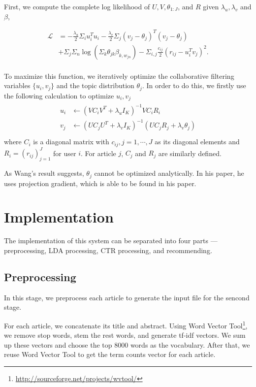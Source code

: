 \documentclass{acm_proc_article-sp}
\begin{document}
First, we compute the complete log likelihood of $U, V, \theta_{1:J}$, and $R$ given $\lambda_u, \lambda_v$ and $\beta$,

\begin{equation}
\begin{aligned}
\mathcal{L}&=-\frac{\lambda_u}{2}\Sigma_iu_i^Tu_i-\frac{\lambda_v}{2}\Sigma_j(v_j-\theta_j)^T(v_j-\theta_j)\\
&+\Sigma_j\Sigma_n\log(\Sigma_k\theta_{jk}\beta_{k,w_{jn}})-\Sigma_{i,j}\frac{c_{ij}}{2}(r_{ij}-u_i^Tv_j)^2.\\
\end{aligned}
\end{equation}

To maximize this function, we iteratively optimize the collaborative filtering variables $\{u_i,v_j\}$ and the topic distribution $\theta_j$. In order to do this, we firstly use the following calculation to optimize $u_i, v_j$
\begin{eqnarray}
\begin{aligned}
u_i &\leftarrow (VC_iV^T+\lambda_uI_K)^{-1}VC_iR_i\\
v_j &\leftarrow (UC_jU^T+\lambda_vI_K)^{-1}(UC_jR_j+\lambda_v\theta_j)\\
\end{aligned}
\end{eqnarray}
where $C_i$ is a diagonal matrix with $c_{ij},j=1,\cdots,J$ as its diagonal elements and $R_i=(r_{ij})^J_{j=1}$ for user $i$. For article $j$, $C_j$ and $R_j$ are similarly defined.

As Wang's result\cite{wang:2011:CTM:2020408.2020480} suggests, $\theta_j$ cannot be optimized analytically. In his paper, he uses projection gradient, which is able to be found in his paper.

\section{Implementation}
\label{implementation}
The implementation of this system can be separated into four parts --- preprocessing, LDA processing, CTR processing, and recommending.

\subsection{Preprocessing}
In this stage, we preprocess each article to generate the input file for the sencond stage.

For each article, we concatenate its title and abstract. Using Word Vector Tool\footnote{\url{http://sourceforge.net/projects/wvtool/}}, we remove stop words, stem the rest words, and generate tf-idf vectors. We sum up these vectors and choose the top 8000 words as the vocabulary. After that, we reuse Word Vector Tool to get the term counts vector for each article.
\end{document}
